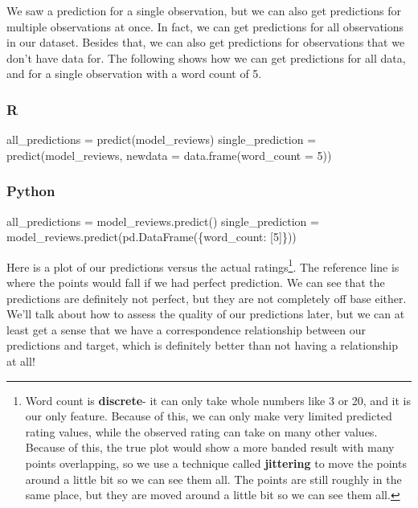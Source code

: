 \documentclass[
  letterpaper,
]{krantz}
\newenvironment{Shaded}{}{}
\newcommand{\AttributeTok}[1]{\textcolor[rgb]{0.49,0.56,0.16}{#1}}
\newcommand{\DecValTok}[1]{\textcolor[rgb]{0.25,0.63,0.44}{#1}}
\newcommand{\FunctionTok}[1]{\textcolor[rgb]{0.02,0.16,0.49}{#1}}
\newcommand{\NormalTok}[1]{#1}
\newcommand{\OperatorTok}[1]{\textcolor[rgb]{0.40,0.40,0.40}{#1}}
\newcommand{\OtherTok}[1]{\textcolor[rgb]{0.00,0.44,0.13}{#1}}
\newcommand{\StringTok}[1]{\textcolor[rgb]{0.25,0.44,0.63}{#1}}
\begin{document}
We saw a prediction for a single observation, but we can also get
predictions for multiple observations at once. In fact, we can get
predictions for all observations in our dataset. Besides that, we can
also get predictions for observations that we don't have data for. The
following shows how we can get predictions for all data, and for a
single observation with a word count of 5.

\subsubsection{R}

\begin{Shaded}
\begin{Highlighting}[]
\NormalTok{all\_predictions }\OtherTok{=} \FunctionTok{predict}\NormalTok{(model\_reviews)}
\NormalTok{single\_prediction }\OtherTok{=} \FunctionTok{predict}\NormalTok{(model\_reviews, }\AttributeTok{newdata =} \FunctionTok{data.frame}\NormalTok{(}\AttributeTok{word\_count =} \DecValTok{5}\NormalTok{))}
\end{Highlighting}
\end{Shaded}

\subsubsection{Python}

\begin{Shaded}
\begin{Highlighting}[]
\NormalTok{all\_predictions   }\OperatorTok{=}\NormalTok{ model\_reviews.predict()}
\NormalTok{single\_prediction }\OperatorTok{=}\NormalTok{ model\_reviews.predict(pd.DataFrame(\{}\StringTok{\textquotesingle{}word\_count\textquotesingle{}}\NormalTok{: [}\DecValTok{5}\NormalTok{]\}))}
\end{Highlighting}
\end{Shaded}

Here is a plot of our predictions versus the actual ratings\footnote{Word
  count is \textbf{discrete}- it can only take whole numbers like 3 or
  20, and it is our only feature. Because of this, we can only make very
  limited predicted rating values, while the observed rating can take on
  many other values. Because of this, the true plot would show a more
  banded result with many points overlapping, so we use a technique
  called \textbf{jittering} to move the points around a little bit so we
  can see them all. The points are still roughly in the same place, but
  they are moved around a little bit so we can see them all.}. The
reference line is where the points would fall if we had perfect
prediction. We can see that the predictions are definitely not perfect,
but they are not completely off base either. We'll talk about how to
assess the quality of our predictions later, but we can at least get a
sense that we have a correspondence relationship between our predictions
and target, which is definitely better than not having a relationship at
all!
\end{document}
